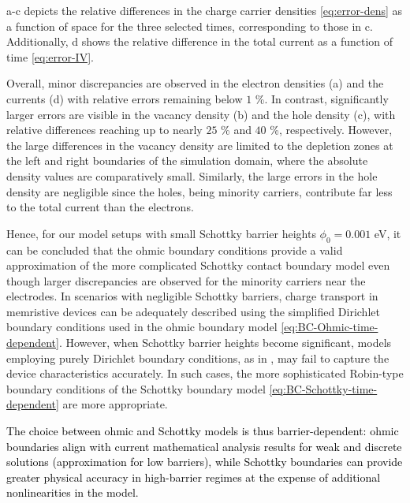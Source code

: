 \documentclass[10pt,a4paper, final]{article}
\newcommand{\reviewerTwo}[1]{\textcolor{black}{#1}}
\theoremstyle{definition}								%
\numberwithin{equation}{section}
\numberwithin{figure}{section}
\numberwithin{theorem}{section}
\begin{document}
a-c depicts the relative differences in the charge carrier densities \eqref{eq:error-dens} as a function of space for the three selected times, corresponding to those in c.
Additionally, d shows the relative difference in the total current as a function of time \eqref{eq:error-IV}.

Overall, minor discrepancies are observed in the electron densities (a) and the currents (d) with relative errors remaining below $1$ \%.
In contrast, significantly larger errors are visible in the vacancy density (b) and the hole density (c), with relative differences reaching up to nearly $25$ \% and $40$ \%, respectively.
However, the large differences in the vacancy density are limited to the depletion zones at the left and right boundaries of the simulation domain, where the absolute density values are comparatively small.
Similarly, the large errors in the hole density are negligible since the holes, being minority carriers, contribute far less to the total current than the electrons.

Hence, for our model setups with small Schottky barrier heights  $\phi_{0} = 0.001$  eV, it can be concluded that the ohmic boundary conditions provide a valid approximation of the more complicated Schottky contact boundary model even though larger discrepancies are observed for the minority carriers near the electrodes.
In scenarios with negligible Schottky barriers, charge transport in memristive devices can be adequately described using the simplified Dirichlet boundary conditions used in the ohmic boundary model \eqref{eq:BC-Ohmic-time-dependent}.
However, when Schottky barrier heights become significant, models employing purely Dirichlet boundary conditions, as in \cite{Jourdana.2023, Jungel.2023, Herda.2024}, may fail to capture the device characteristics accurately.
In such cases, the more sophisticated Robin-type boundary conditions of the Schottky boundary model \eqref{eq:BC-Schottky-time-dependent} are more appropriate.

\reviewerTwo{
    The choice between ohmic and Schottky models is thus barrier-dependent: ohmic boundaries align with current mathematical analysis results for weak and discrete solutions (approximation for low barriers), while Schottky boundaries can provide greater physical accuracy in high-barrier regimes at the expense of additional nonlinearities in the model.
}
\end{document}
